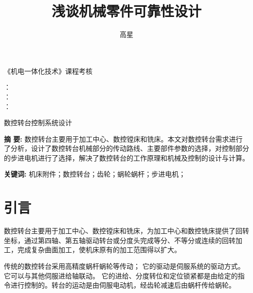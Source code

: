 \documentclass[a4paper,12pt]{article}
\title{浅谈机械零件可靠性设计}
\author{高星}
\begin{document}
	
\begin{titlepage}
\begin{center}
\mbox{}
\vspace{1cm}

{  \bf \kai \fontsize{36pt}{50pt}\selectfont {}}
\vspace{0.5cm}

{  \bf \kai \fontsize{36pt}{50pt} \selectfont {}}
\vspace{0.5cm}

\sihao 《机电一体化技术》课程考核 
\vfill
\vfill 

\sanhao \linespread{2}
 
 ：~
\underline{ }\\
 ：~
\underline{ }\\ ：~
\underline{ }\\			   
\vfill
\end{center}
\end{titlepage}

\begin{titlepage}
\tableofcontents
\end{titlepage}

\sihao
\begin{center}
	 \erhao  \hei   数控转台控制系统设计 
\end{center} 
\sihao \setlength{\parindent}{2em}    

{\bf 摘 要: }
数控转台主要用于加工中心、数控镗床和铣床。本文对数控转台需求进行了分析，设计了数控转台机械部分的传动路线、主要部件参数的选择，对控制部分的步进电机进行了选择，解决了数控转台的工作原理和机械及控制的设计与计算。

{\bf 关键词: }机床附件；数控转台；齿轮；蜗轮蜗杆；步进电机；

\setcounter{section}{-1}
\section{引言} 
\sihao \setlength{ \baselineskip }{25pt}

数控转台主要用于加工中心、数控镗床和铣床，为加工中心和数控铣床提供了回转坐标，通过第四轴、第五轴驱动转台或分度头完成等分、不等分或连续的回转加工，完成复杂曲面加工，使机床原有的加工范围得以扩大。

传统的数控转台采用高精度蜗杆蜗轮等传动；
它的驱动是伺服系统的驱动方式。它可以与其他伺服进给轴联动。
它的进给、分度转位和定位锁紧都是由给定的指令进行控制的。转台的运动是由伺服电动机，经齿轮减速后由蜗杆传给蜗轮。
\end{document}
